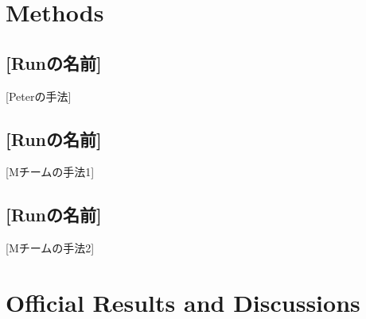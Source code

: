 \documentclass{../style/sig-alternate}
\begin{document}
\section{Methods}
\label{s:methods}

\subsection{[Runの名前]}

[Peterの手法]

\subsection{[Runの名前]}

[Mチームの手法1]

\subsection{[Runの名前]}

[Mチームの手法2]

\section{Official Results and Discussions}\label{s:results}





\end{document}
